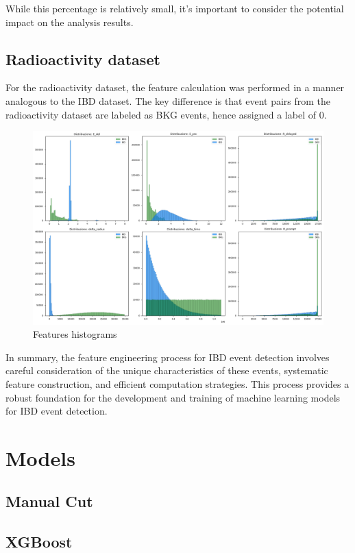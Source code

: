 While this percentage is relatively small, it's important to consider the potential impact on the analysis results.

\subsection{Radioactivity dataset}
For the radioactivity dataset, the feature calculation was performed in a manner analogous to the IBD dataset. The key difference is that event pairs from the radioactivity dataset are labeled as BKG events, hence assigned a label of 0.



\begin{figure}[h]
	\centering
	\includegraphics[width=1\linewidth]{Images/hist_features.png}
	\caption{Features histograms}
	\label{fig:hist_features}
\end{figure}



In summary, the feature engineering process for IBD event detection involves careful consideration of the unique characteristics of these events, systematic feature construction, and efficient computation strategies. This process provides a robust foundation for the development and training of machine learning models for IBD event detection.

\section{Models}
\subsection{Manual Cut}
\subsection{XGBoost}
